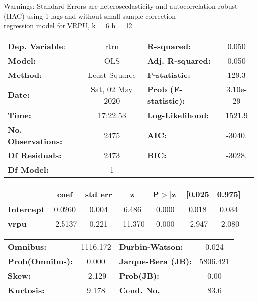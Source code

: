 Warnings: \newline
 [1] Standard Errors are heteroscedasticity and autocorrelation robust (HAC) using 1 lags and without small sample correction\\ 

regression model for VRPU, k = 6 h = 12\begin{center}
\begin{tabular}{lclc}
\toprule
\textbf{Dep. Variable:}    &       rtrn       & \textbf{  R-squared:         } &     0.050   \\
\textbf{Model:}            &       OLS        & \textbf{  Adj. R-squared:    } &     0.050   \\
\textbf{Method:}           &  Least Squares   & \textbf{  F-statistic:       } &     129.3   \\
\textbf{Date:}             & Sat, 02 May 2020 & \textbf{  Prob (F-statistic):} &  3.10e-29   \\
\textbf{Time:}             &     17:22:53     & \textbf{  Log-Likelihood:    } &    1521.9   \\
\textbf{No. Observations:} &        2475      & \textbf{  AIC:               } &    -3040.   \\
\textbf{Df Residuals:}     &        2473      & \textbf{  BIC:               } &    -3028.   \\
\textbf{Df Model:}         &           1      & \textbf{                     } &             \\
\bottomrule
\end{tabular}
\begin{tabular}{lcccccc}
                   & \textbf{coef} & \textbf{std err} & \textbf{z} & \textbf{P$> |$z$|$} & \textbf{[0.025} & \textbf{0.975]}  \\
\midrule
\textbf{Intercept} &       0.0260  &        0.004     &     6.486  &         0.000        &        0.018    &        0.034     \\
\textbf{vrpu}      &      -2.5137  &        0.221     &   -11.370  &         0.000        &       -2.947    &       -2.080     \\
\bottomrule
\end{tabular}
\begin{tabular}{lclc}
\textbf{Omnibus:}       & 1116.172 & \textbf{  Durbin-Watson:     } &    0.024  \\
\textbf{Prob(Omnibus):} &   0.000  & \textbf{  Jarque-Bera (JB):  } & 5806.421  \\
\textbf{Skew:}          &  -2.129  & \textbf{  Prob(JB):          } &     0.00  \\
\textbf{Kurtosis:}      &   9.178  & \textbf{  Cond. No.          } &     83.6  \\
\bottomrule
\end{tabular}
\end{center}

